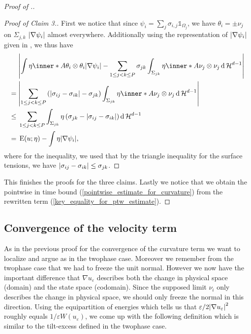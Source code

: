 \begin{proof}[Proof of .]
	\begin{proof}[Proof of Claim 3.]
		First we notice that since $ \psi_{ i } = \sum_{ j } \sigma_{ i , j } 
		\mathds{ 1 }_{ \Omega_{ j } } $, we have $ \theta_{ i } = \pm \nu_{ j } 
		$ on $ \Sigma_{ j , k } $ $ \abs{ \nabla \psi_{ i } }$ almost 
		everywhere.
		Additionally using the representation of $ \abs{ \nabla \psi_{ i } } $ 
		given in 
		, we thus have
		\begin{align*}
			&
			\abs{
				\int
					\eta 
					\inner*{ A }
					{ \theta_{ i } \otimes \theta_{ i } }
				\abs{ \nabla \psi_{ i } }
				-
				\sum_{ 1 \leq j < k \leq P }
					\sigma_{ j k }
					\int_{ \Sigma_{ j k } }
						\eta
						\inner*{ A }{ \nu_{ j } \otimes \nu_{ j } }
					\dd{ \hm^{ d - 1 } }
			}
			\\
			={} &
			\abs{ 
				\sum_{ 1 \leq j < k \leq P }
					\left( 
						\abs{ \sigma_{ i j } - \sigma_{ i k } }
						-
						\sigma_{ j k }
					\right)
					\int_{ \Sigma_{ j k  } }
						\eta
						\inner*{ A }{ \nu_{ j } \otimes \nu_{ j } }
					\dd{ \hm^{ d - 1 } }
			}
			\\
			\leq{} &
			\sum_{ 1 \leq j < k \leq P }
				\int_{ \Sigma_{ j k } }
					\eta
					\left(
						\sigma_{ j  k } - \abs{ \sigma_{ i j } - \sigma_{ i 
					 k } }
					\right)
				\dd{ \hm^{ d - 1 } }
			\\
			={} &
			\energy ( u ; \eta )
			-
			\int
				\eta
			\abs{ \nabla \psi_{ i } },
		\end{align*}
		where for the inequality, we used that by the triangle inequality for 
		the surface tensions, we have
		$ \abs{ \sigma_{ i j } - \sigma_{ i k } } \leq \sigma_{ j k } $.
	\end{proof}
	This finishes the proofs for the three claims. Lastly we notice that we 
	obtain the pointwise in time bound (\ref{pointwise_estimate_for_curvature}) 
	from the rewritten term (\ref{key_equality_for_ptw_estimate}).
\end{proof}

\subsection{Convergence of the velocity term}

As in the previous proof for the convergence of the curvature term we want to 
localize and argue as in the twophase case. Moreover we remember from the 
twophase case that we had to freeze the unit normal. However we now have the 
important difference that $ \nabla u_{ \varepsilon } $ describes both the 
change in physical space (domain) and the state space (codomain). Since the 
supposed limit $ \nu_{ i } $ only describes the change in physical space, we 
should only freeze the normal in this direction. Using the equipartition of 
energies  which tells us that $ 
\varepsilon / 2 \abs{ \nabla u_{ \varepsilon } }^{ 2 } $ roughly equals $ 1 / 
\varepsilon W ( u_{ \varepsilon } ) $, we come up with the following definition 
which is similar to the tilt-excess defined in the twophase case.

